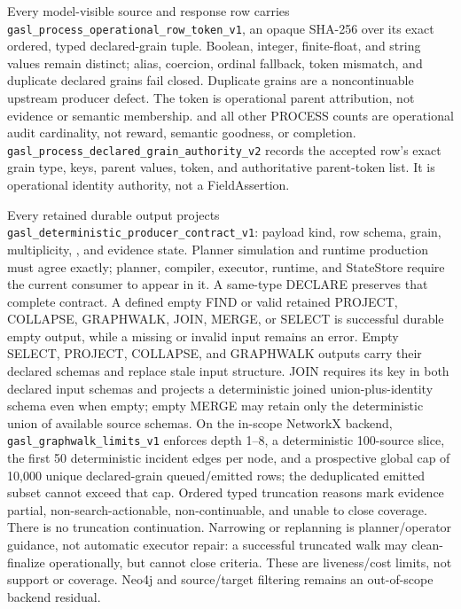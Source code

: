 \documentclass[11pt]{article}
\newcommand{\code}[1]{\path{#1}}
\newcommand{\action}[1]{\texttt{#1}}
\begin{document}
Every model-visible source and response row carries
\action{gasl\_process\_operational\_row\_token\_v1}, an opaque SHA-256 over its
exact ordered, typed declared-grain tuple.  Boolean, integer, finite-float, and
string values remain distinct; alias, coercion, ordinal fallback, token
mismatch, and duplicate declared grains fail closed.  Duplicate grains are a
noncontinuable upstream producer defect.  The token is operational parent
attribution, not evidence or semantic membership.
\code{target\_row\_count} and all other PROCESS counts are operational audit
cardinality, not reward, semantic goodness, or completion.
\action{gasl\_process\_declared\_grain\_authority\_v2} records the accepted
row's exact grain type, keys, parent values, token, and authoritative
parent-token list.  It is operational identity authority, not a FieldAssertion.

Every retained durable output projects
\action{gasl\_deterministic\_producer\_contract\_v1}: payload kind, row schema,
grain, multiplicity, \code{usable\_by}, and evidence state.  Planner simulation
and runtime production must agree exactly; planner, compiler, executor, runtime, and
StateStore require the current consumer to appear in it.  A same-type DECLARE
preserves that complete contract.  A defined empty FIND or valid retained
PROJECT, COLLAPSE, GRAPHWALK, JOIN, MERGE, or SELECT is successful durable
empty output, while a missing or invalid input remains an error.  Empty SELECT,
PROJECT, COLLAPSE, and GRAPHWALK outputs carry their declared schemas and replace
stale input structure.  JOIN requires its key in both declared input schemas and
projects a deterministic joined union-plus-identity schema even when empty;
empty MERGE may retain only the deterministic union of available source
schemas.  On the in-scope NetworkX backend,
\action{gasl\_graphwalk\_limits\_v1} enforces depth 1--8, a deterministic
100-source slice, the first 50 deterministic incident edges per node, and a
prospective global cap of 10,000 unique declared-grain queued/emitted rows; the
deduplicated emitted subset cannot exceed that cap.  Ordered typed truncation
reasons mark evidence partial, non-search-actionable, non-continuable, and unable
to close coverage.  There is no truncation continuation.  Narrowing or
replanning is planner/operator guidance, not automatic executor repair: a
successful truncated walk may clean-finalize operationally, but cannot close
criteria.  These are liveness/cost limits, not support or coverage.  Neo4j
\code{id\_filter} and source/target filtering remains an out-of-scope backend
residual.
\end{document}
